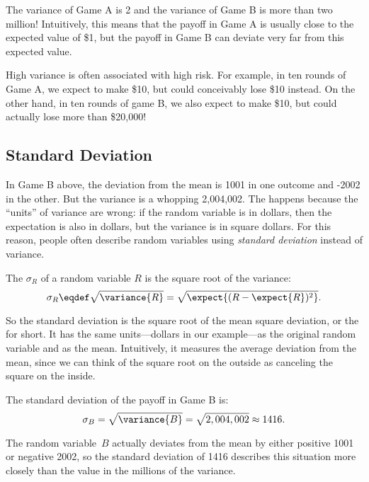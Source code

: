 The variance of Game A is 2 and the variance of Game B is more than
two million!  Intuitively, this means that the payoff in Game A is
usually close to the expected value of \$1, but the payoff in Game B
can deviate very far from this expected value.

High variance is often associated with high risk.  For example, in ten
rounds of Game A, we expect to make \$10, but could conceivably lose
\$10  instead.  On the other hand, in ten rounds of game B, we also
expect to make \$10, but could actually lose more than \$20,000!

\subsection{Standard Deviation}

In Game B above, the deviation from the mean is 1001 in one outcome
and -2002 in the other.  But the variance is a whopping 2,004,002.
The happens because the ``units'' of variance are wrong: if the random
variable is in dollars, then the expectation is also in dollars, but
the variance is in square dollars.  For this reason, people often
describe random variables using \emph{standard deviation} instead of
variance.

\begin{definition}
The  $\sigma_R$ of a random variable $R$ is
the square root of the variance:
\[
\sigma_R \eqdef \sqrt{\variance{R}} = \sqrt{\expect{(R - \expect{R})^2}}.
\]      
\end{definition}

So the standard deviation is the square root of the mean square
deviation, or the  for short.  It has the same
units---dollars in our example---as the original random variable and
as the mean.  Intuitively, it measures the average deviation from the
mean, since we can think of the square root on the outside as
canceling the square on the inside.

\begin{example}
The standard deviation of the payoff in Game B is:
\[
    \sigma_B  = \sqrt{\variance{B}} = \sqrt{2,004,002} \approx 1416.
\]

The random variable~$B$ actually deviates from the mean by either
positive 1001 or negative 2002, so the standard deviation of 1416
describes this situation more closely than the value in the millions
of the variance.
\end{example}

